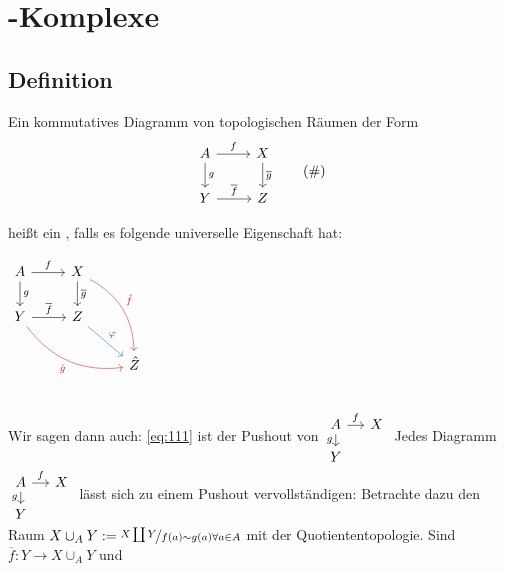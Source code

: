 \section{\CW-Komplexe} %
\label{sec:11}

\subsection[Definition: Pushout]{Definition} %
\label{sub:111}
Ein kommutatives Diagramm von topologischen Räumen der Form
\begin{equation*}
	\begin{tikzcd}
		A \rar["f"] \dar["g"] & X \dar["\overline{g} "] \\
		Y \rar["\overline{f}"] & Z
	\end{tikzcd} \label{eq:111} \tag{\#}
\end{equation*}
\noindent\begin{minipage}{0.65\textwidth}
	heißt ein , falls es folgende universelle Eigenschaft hat: \smallskip\\
\end{minipage}
\hfill \begin{minipage}{0.3\textwidth}
	\(
		\begin{tikzcd}
			A \rar["f"] \dar["g"] & X \dar["\overline{g}"] \arrow[ddr, "\hat{f}", bend left, Firebrick3] \\
			Y \rar["\overline{f}"] \arrow[drr, "\hat{g}"',bend right, Firebrick3] & Z  \drar["\varphi", DodgerBlue3] \\
			& & \hat{Z}
		\end{tikzcd}
	\)
\end{minipage}\\
Wir sagen dann auch: \eqref{eq:111} ist der Pushout von 
\(
	\begin{tikzcd}[sep=small]
		A \rar["f"] \dar["g"']& X \\
		Y
	\end{tikzcd}
\)
Jedes Diagramm $\begin{tikzcd}[sep=small]
		A \rar["f"] \dar["g"']& X \\
		Y
	\end{tikzcd}$ lässt sich zu einem Pushout vervollständigen:
Betrachte dazu den Raum $X \cup_A Y := \nicefrac{X \coprod Y}{f(a) \sim g(a) \forall a \in A}$ mit der Quotiententopologie. Sind $\overline{f}\colon Y \to X \cup_A Y $  und 
